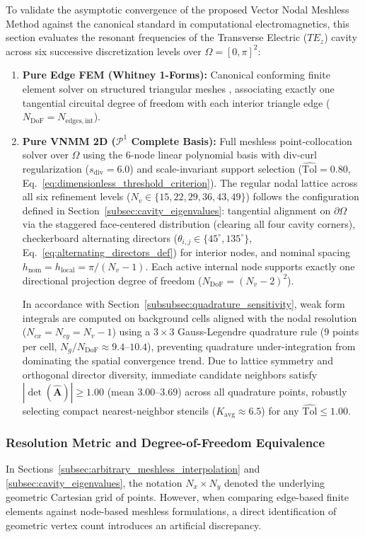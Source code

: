 \documentclass[preprint,12pt]{elsarticle}
\begin{document}
To validate the asymptotic convergence of the proposed Vector Nodal Meshless Method against the canonical standard in computational electromagnetics, this section evaluates the resonant frequencies of the Transverse Electric ($TE_z$) cavity across six successive discretization levels over $\Omega = [0, \pi]^2$:
\begin{enumerate}
    \item \textbf{Pure Edge FEM (Whitney 1-Forms):} Canonical conforming finite element solver on structured triangular meshes \cite{monk2003finite}, associating exactly one tangential circuital degree of freedom with each interior triangle edge ($N_{\mathrm{DoF}} = N_{\mathrm{edges, int}}$).
    \item \textbf{Pure VNMM 2D ($\mathcal{P}^1$ Complete Basis):} Full meshless point-collocation solver over $\Omega$ using the 6-node linear polynomial basis with div-curl regularization ($s_{\mathrm{div}} = 6.0$) and scale-invariant support selection ($\widehat{\mathrm{Tol}} = 0.80$, Eq.~\eqref{eq:dimensionless_threshold_criterion}). The regular nodal lattice across all six refinement levels ($N_v \in \{15, 22, 29, 36, 43, 49\}$) follows the configuration defined in Section~\ref{subsec:cavity_eigenvalues}: tangential alignment on $\partial\Omega$ via the staggered face-centered distribution (clearing all four cavity corners), checkerboard alternating directors ($\theta_{i,j} \in \{45^\circ, 135^\circ\}$, Eq.~\eqref{eq:alternating_directors_def}) for interior nodes, and nominal spacing $h_{\mathrm{nom}} = h_{\mathrm{local}} = \pi / (N_v - 1)$. Each active internal node supports exactly one directional projection degree of freedom ($N_{\mathrm{DoF}} = (N_v - 2)^2$).

          In accordance with Section~\ref{subsubsec:quadrature_sensitivity}, weak form integrals are computed on background cells aligned with the nodal resolution ($N_{cx} = N_{cy} = N_v - 1$) using a $3 \times 3$ Gauss-Legendre quadrature rule ($9$ points per cell, $N_g / N_{\mathrm{DoF}} \approx 9.4\text{--}10.4$), preventing quadrature under-integration from dominating the spatial convergence trend. Due to lattice symmetry and orthogonal director diversity, immediate candidate neighbors satisfy $|\det(\widehat{\mathbf{A}})| \ge 1.00$ (mean $3.00\text{--}3.69$) across all quadrature points, robustly selecting compact nearest-neighbor stencils ($K_{\mathrm{avg}} \approx 6.5$) for any $\widehat{\mathrm{Tol}} \le 1.00$.
\end{enumerate}

\subsubsection{Resolution Metric and Degree-of-Freedom Equivalence}
In Sections~\ref{subsec:arbitrary_meshless_interpolation} and \ref{subsec:cavity_eigenvalues}, the notation $N_x \times N_y$ denoted the underlying geometric Cartesian grid of points. However, when comparing edge-based finite elements against node-based meshless formulations, a direct identification of geometric vertex count introduces an artificial discrepancy.
\end{document}
